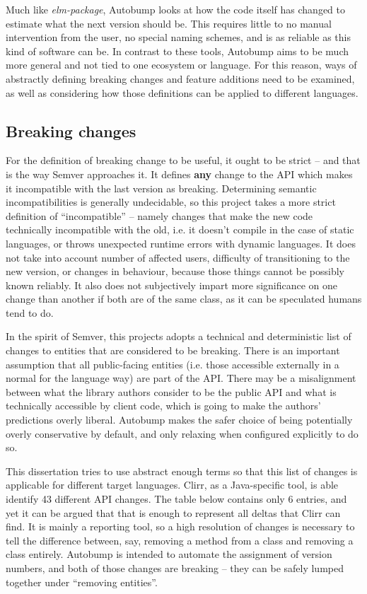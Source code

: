 \documentclass{l4proj}
\begin{document}
Much like \textit{elm-package}, Autobump looks at how the code itself
has changed to estimate what the next version should be. This requires
little to no manual intervention from the user, no special naming
schemes, and is as reliable as this kind of software can be. In
contrast to these tools, Autobump aims to be much more general and
not tied to one ecosystem or language. For this reason,
ways of abstractly defining breaking changes and feature additions
need to be examined, as well as considering how those definitions can
be applied to different languages.

\subsection{Breaking changes}
\label{BreakingChanges}

For the definition of breaking change to be useful, it ought to be
strict -- and that is the way Semver approaches it. It defines
\textbf{any} change to the API which makes it incompatible with the
last version as breaking. Determining semantic incompatibilities is
generally undecidable, so this project takes a more strict definition of
``incompatible'' -- namely changes that make the new code technically
incompatible with the old, i.e. it doesn't compile in the case of
static languages, or throws unexpected runtime errors with dynamic
languages. It does not take into account number of affected users,
difficulty of transitioning to the new version, or changes in
behaviour, because those things cannot be possibly known reliably. It
also does not subjectively impart more significance on one change than
another if both are of the same class, as it can be speculated humans
tend to do.

In the spirit of Semver, this projects adopts a technical and
deterministic list of changes to entities that are considered
to be breaking. There is an important assumption that all
public-facing entities (i.e. those accessible externally in a normal
for the language way) are part of the API. There may be a misalignment
between what the library authors consider to be the public API and
what is technically accessible by client code, which is going to make
the authors' predictions overly liberal. Autobump makes the safer
choice of being potentially overly conservative by default, and only
relaxing when configured explicitly to do so.

This dissertation tries to use abstract enough terms so that this list
of changes is applicable for different target languages. Clirr, as a
Java-specific tool, is able identify 43 different API changes. The
table below contains only 6 entries, and yet it can be argued that
that is enough to represent all deltas that Clirr can find. It is
mainly a reporting tool, so a high resolution of changes is necessary
to tell the difference between, say, removing a method from a class
and removing a class entirely. Autobump is intended to automate the
assignment of version numbers, and both of those changes are breaking
-- they can be safely lumped together under ``removing entities''.
\end{document}
